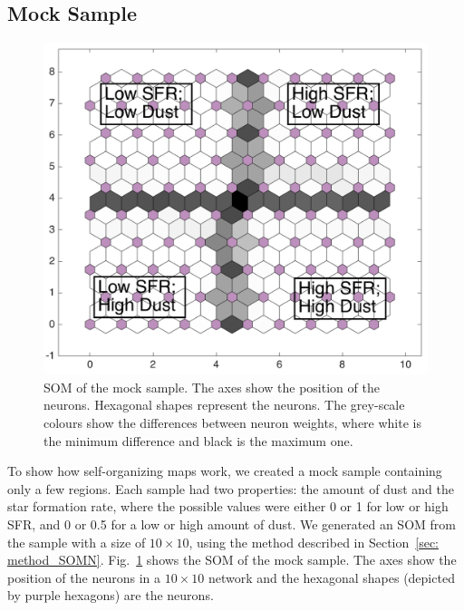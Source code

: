 \subsection{Mock Sample}
\label{sec: mock_sample}
 
         \begin{figure}
                \centering
                \includegraphics[width=\textwidth]{../image_paper3/images0.01/mock_sample.png}
            \caption[Self-organizing map of the mock sample]{SOM of the mock sample. The axes show the position of the neurons. Hexagonal shapes represent the neurons. The grey-scale colours show the differences between neuron weights, where white is the minimum difference and black is the maximum one.}
            \label{fig: sample}
        \end{figure}
 
To show how self-organizing maps work, we created a mock sample containing only a few regions.
Each sample had two properties: the amount of dust and the star formation rate, where the possible values were
either 0 or 1 for low or high SFR, and 0 or 0.5 for a low or high amount of dust. 
 We generated an SOM from the sample with a size of $10 \times 10$, using the method described in Section~\ref{sec: method_SOMN}.
 Fig.~\ref{fig: sample} shows the SOM of the mock sample. 
 The axes show the position of the neurons in a $10 \times 10$ network and the hexagonal shapes (depicted by purple hexagons) are the neurons.
 
